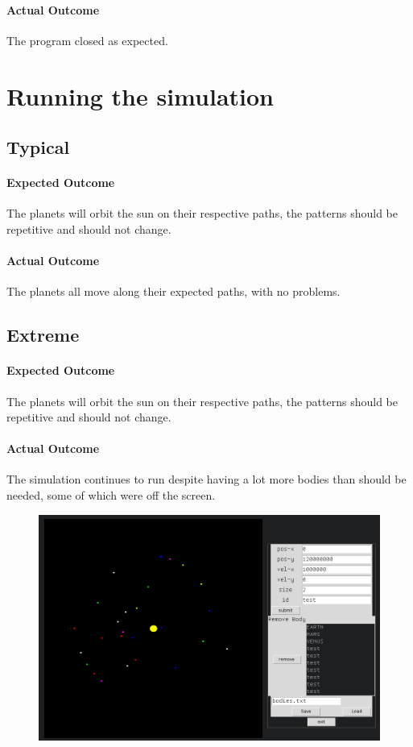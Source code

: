 \paragraph{Actual Outcome}
The program closed as expected.

\section{Running the simulation}
\subsection{Typical}
\paragraph{Expected Outcome}
The planets will orbit the sun on their respective paths, the patterns should be
repetitive and should not change.
\paragraph{Actual Outcome}
The planets all move along their expected paths, with no problems.

\subsection{Extreme}
\paragraph{Expected Outcome}
The planets will orbit the sun on their respective paths, the patterns should be
repetitive and should not change.
\paragraph{Actual Outcome}
The simulation continues to run despite having a lot more bodies than should be
needed, some of which were off the screen.
\begin{figure}[H]
	\includegraphics[width=\textwidth]{./img/run.png}
\end{figure}


